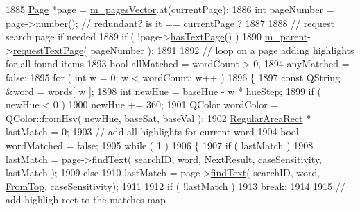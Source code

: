 \begin{DoxyCode}
1885         \hyperlink{classOkular_1_1Page}{Page} *page = \hyperlink{classOkular_1_1DocumentPrivate_a73b852d9a73ffe8061b66dbf9b290f17}{m\_pagesVector}.at(currentPage);
1886         \textcolor{keywordtype}{int} pageNumber = page->\hyperlink{classOkular_1_1Page_a6eee5f157a130b47d81ddd63e501664b}{number}(); \textcolor{comment}{// redundant? is it == currentPage ?}
1887 
1888         \textcolor{comment}{// request search page if needed}
1889         \textcolor{keywordflow}{if} ( !page->\hyperlink{classOkular_1_1Page_a44163bc0e76204a9d9c42da442ee734a}{hasTextPage}() )
1890             \hyperlink{classOkular_1_1DocumentPrivate_ac921eda41c014869ffec96ecc569c713}{m\_parent}->\hyperlink{classOkular_1_1Document_ad4909d8411d3ad8faf716f30a6e9f417}{requestTextPage}( pageNumber );
1891 
1892         \textcolor{comment}{// loop on a page adding highlights for all found items}
1893         \textcolor{keywordtype}{bool} allMatched = wordCount > 0,
1894              anyMatched = \textcolor{keyword}{false};
1895         \textcolor{keywordflow}{for} ( \textcolor{keywordtype}{int} w = 0; w < wordCount; w++ )
1896         \{
1897             \textcolor{keyword}{const} QString &word = words[ w ];
1898             \textcolor{keywordtype}{int} newHue = baseHue - w * hueStep;
1899             \textcolor{keywordflow}{if} ( newHue < 0 )
1900                 newHue += 360;
1901             QColor wordColor = QColor::fromHsv( newHue, baseSat, baseVal );
1902             \hyperlink{classOkular_1_1RegularAreaRect}{RegularAreaRect} * lastMatch = 0;
1903             \textcolor{comment}{// add all highlights for current word}
1904             \textcolor{keywordtype}{bool} wordMatched = \textcolor{keyword}{false};
1905             \textcolor{keywordflow}{while} ( 1 )
1906             \{
1907                 \textcolor{keywordflow}{if} ( lastMatch )
1908                     lastMatch = page->\hyperlink{classOkular_1_1Page_a02f1143ff5c69b04f4b514c04566864f}{findText}( searchID, word, 
      \hyperlink{namespaceOkular_ad7ede3c5a1b1a8bfd83f133e7e3ed9d2ae206453ab991a0ffea7c198f8ef600c4}{NextResult}, caseSensitivity, lastMatch );
1909                 \textcolor{keywordflow}{else}
1910                     lastMatch = page->\hyperlink{classOkular_1_1Page_a02f1143ff5c69b04f4b514c04566864f}{findText}( searchID, word, \hyperlink{namespaceOkular_ad7ede3c5a1b1a8bfd83f133e7e3ed9d2a12e1e0d5fba44b6eb075863eb0992cf6}{FromTop}, caseSensitivity);
1911 
1912                 \textcolor{keywordflow}{if} ( !lastMatch )
1913                     \textcolor{keywordflow}{break};
1914 
1915                 \textcolor{comment}{// add highligh rect to the matches map}

\end{DoxyCode}
